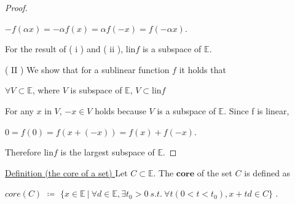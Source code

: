\documentclass[a4paper,11pt]{jsarticle}
\begin{document}
\begin{proof}
  \begin{center}
    $-f(\alpha x) = - \alpha f(x) = \alpha f(-x) = f(- \alpha x)$.
  \end{center}

  For the result of ( $\mathrm{i}$ ) and ( $\mathrm{ii}$ ), $\text{lin}f$ is a subspace of $\mathbb{E}$.

  ( $\mathrm{II}$ ) We show that for a sublinear function $f$ it holds that

  \begin{center}
    $\forall V \subset \mathbb{E}$, where $V$ is subspace of $\mathbb{E}$, $V \subset \text{lin}f$
  \end{center}

  For any $x$ in $V$, $-x \in V$ holds because $V$ is a subspace of $\mathbb{E}$. Since f is linear,

  \begin{center}
    $0 = f(0) = f(x + (-x)) = f(x) + f(-x)$.
  \end{center}

  Therefore $\text{lin}f$ is the largest subspace of $\mathbb{E}$.
\end{proof}

\begin{center}
\end{center}

\begin{itembox}[l]{\underline{Definition (the core of a set) }}
  Let $C \subset \mathbb{E}$. The $\textbf{core}$ of the set $C$ is defined as

  \begin{center}
    $core (C)$ $\coloneqq$ $\{x \in \mathbb{E} \:|\: \forall d \in \mathbb{E}, \exists t_0 > 0 \:s.t.\: \forall t (0<t<t_0), x+td \in C \}$ .
  \end{center}
\end{itembox}
\end{document}
